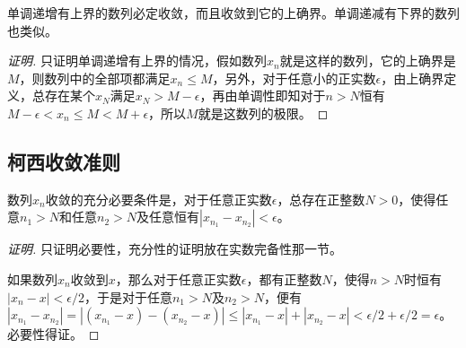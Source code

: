 \begin{theorem}
  单调递增有上界的数列必定收敛，而且收敛到它的上确界。单调递减有下界的数列也类似。
\end{theorem}

\begin{proof}[证明]
  只证明单调递增有上界的情况，假如数列$x_n$就是这样的数列，它的上确界是$M$，则数列中的全部项都满足$x_n \leqslant M$，另外，对于任意小的正实数$\epsilon$，由上确界定义，总存在某个$x_N$满足$x_N>M-\epsilon$，再由单调性即知对于$n>N$恒有$M-\epsilon < x_n \leqslant M < M+\epsilon$，所以$M$就是这数列的极限。
\end{proof}

\subsection{柯西收敛准则}
\label{sec:cauchy-converage-principle}

\begin{theorem}[柯西收敛准则]
  数列$x_n$收敛的充分必要条件是，对于任意正实数$\epsilon$，总存在正整数$N>0$，使得任意$n_1>N$和任意$n_2>N$及任意恒有$|x_{n_1}-x_{n_2}| < \epsilon$。
\end{theorem}

\begin{proof}[证明]
  只证明必要性，充分性的证明放在实数完备性那一节。

  如果数列$x_n$收敛到$x$，那么对于任意正实数$\epsilon$，都有正整数$N$，使得$n>N$时恒有$|x_n-x|<\epsilon / 2$，于是对于任意$n_1>N$及$n_2>N$，便有$|x_{n_1}-x_{n_2}|=|(x_{n_1}-x)- (x_{n_2}-x)|\leqslant |x_{n_1}-x|+|x_{n_2}-x|<\epsilon / 2+\epsilon / 2 = \epsilon$。必要性得证。
\end{proof}


